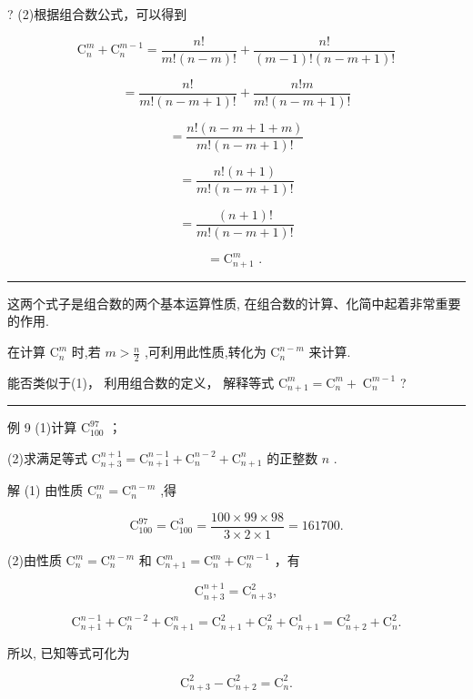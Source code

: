 \documentclass[10pt]{article}
\newcommand{\HRule}{\begin{center}\rule{0.9\linewidth}{0.2mm}\end{center}}
\begin{document}
? (2)根据组合数公式，可以得到

\[
{\mathrm{C}}_{n}^{m} + {\mathrm{C}}_{n}^{m - 1} = \frac{n!}{m!\left( {n - m}\right) !} + \frac{n!}{\left( {m - 1}\right) !\left( {n - m + 1}\right) !}
\]

\[
= \frac{n!}{m!\left( {n - m + 1}\right) !} + \frac{n!m}{m!\left( {n - m + 1}\right) !}
\]



\[
= \frac{n!\left( {n - m + 1 + m}\right) }{m!\left( {n - m + 1}\right) !}
\]

\[
= \frac{n!\left( {n + 1}\right) }{m!\left( {n - m + 1}\right) !}
\]

\[
= \frac{\left( {n + 1}\right) !}{m!\left( {n - m + 1}\right) !}
\]

\[
= {\mathrm{C}}_{n + 1}^{m}\text{ . }
\]

\HRule

这两个式子是组合数的两个基本运算性质, 在组合数的计算、化简中起着非常重要的作用.

在计算 \({\mathrm{C}}_{n}^{m}\) 时,若 \(m > \frac{n}{2}\) ,可利用此性质,转化为 \({\mathrm{C}}_{n}^{n - m}\) 来计算.

能否类似于(1)， 利用组合数的定义， 解释等式 \({\mathrm{C}}_{n + 1}^{m} = {\mathrm{C}}_{n}^{m} + \; {\mathrm{C}}_{n}^{m - 1}\) ?

\HRule

例 9 (1)计算 \({\mathrm{C}}_{100}^{97}\) ；

(2)求满足等式 \({\mathrm{C}}_{n + 3}^{n + 1} = {\mathrm{C}}_{n + 1}^{n - 1} + {\mathrm{C}}_{n}^{n - 2} + {\mathrm{C}}_{n + 1}^{n}\) 的正整数 \(n\) .

解 (1) 由性质 \({\mathrm{C}}_{n}^{m} = {\mathrm{C}}_{n}^{n - m}\) ,得

\[
{\mathrm{C}}_{100}^{97} = {\mathrm{C}}_{100}^{3} = \frac{{100} \times  {99} \times  {98}}{3 \times  2 \times  1} = {161700}.
\]

(2)由性质 \({\mathrm{C}}_{n}^{m} = {\mathrm{C}}_{n}^{n - m}\) 和 \({\mathrm{C}}_{n + 1}^{m} = {\mathrm{C}}_{n}^{m} + {\mathrm{C}}_{n}^{m - 1}\) ，有

\[
{\mathrm{C}}_{n + 3}^{n + 1} = {\mathrm{C}}_{n + 3}^{2},
\]

\[
{\mathrm{C}}_{n + 1}^{n - 1} + {\mathrm{C}}_{n}^{n - 2} + {\mathrm{C}}_{n + 1}^{n} = {\mathrm{C}}_{n + 1}^{2} + {\mathrm{C}}_{n}^{2} + {\mathrm{C}}_{n + 1}^{1} = {\mathrm{C}}_{n + 2}^{2} + {\mathrm{C}}_{n}^{2}.
\]

所以, 已知等式可化为

\[
{\mathrm{C}}_{n + 3}^{2} - {\mathrm{C}}_{n + 2}^{2} = {\mathrm{C}}_{n}^{2}.
\]
\end{document}
